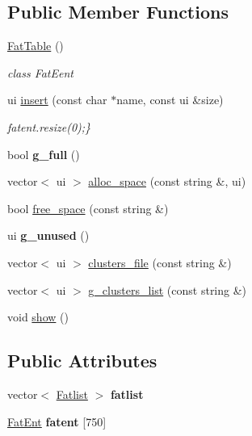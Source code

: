 \subsection*{Public Member Functions}
\begin{DoxyCompactItemize}
\item 
\hyperlink{classFatTable_a848a7e9e14bd9d24fcfb48449fdfae77}{Fat\+Table} ()
\begin{DoxyCompactList}\small\item\em class Fat\+Eent \end{DoxyCompactList}\item 
ui \hyperlink{classFatTable_ae5bcce7262ced6cab5a164c40307c350}{insert} (const char $\ast$name, const ui \&size)\hypertarget{classFatTable_ae5bcce7262ced6cab5a164c40307c350}{}\label{classFatTable_ae5bcce7262ced6cab5a164c40307c350}

\begin{DoxyCompactList}\small\item\em fatent.\+resize(0);\} \end{DoxyCompactList}\item 
bool {\bfseries g\+\_\+full} ()\hypertarget{classFatTable_a0cbc50b29715a3b78322072dc5e18138}{}\label{classFatTable_a0cbc50b29715a3b78322072dc5e18138}

\item 
vector$<$ ui $>$ \hyperlink{classFatTable_a566150049a050b7add0046800995bf06}{alloc\+\_\+space} (const string \&, ui)
\item 
bool \hyperlink{classFatTable_a1e1637f54b2cc7a6c436a3c8dd86f990}{free\+\_\+space} (const string \&)
\item 
ui {\bfseries g\+\_\+unused} ()\hypertarget{classFatTable_a7b290d7cbffd8ee2fb1deb5c84188c0e}{}\label{classFatTable_a7b290d7cbffd8ee2fb1deb5c84188c0e}

\item 
vector$<$ ui $>$ \hyperlink{classFatTable_a81b335ad0538ee26afd7db168516ab08}{clusters\+\_\+file} (const string \&)
\item 
vector$<$ ui $>$ \hyperlink{classFatTable_a30f820bb48f85776482ac5248735fdd2}{g\+\_\+clusters\+\_\+list} (const string \&)
\item 
void \hyperlink{classFatTable_a45b8a123cf7f9124a950aa27d9aa9e28}{show} ()
\end{DoxyCompactItemize}
\subsection*{Public Attributes}
\begin{DoxyCompactItemize}
\item 
vector$<$ \hyperlink{classFatlist}{Fatlist} $>$ {\bfseries fatlist}\hypertarget{classFatTable_aa6ba21e5bfde8f742c4fe3f181a44aa2}{}\label{classFatTable_aa6ba21e5bfde8f742c4fe3f181a44aa2}

\item 
\hyperlink{classFatEnt}{Fat\+Ent} {\bfseries fatent} \mbox{[}750\mbox{]}\hypertarget{classFatTable_a23728b70a23aa0f3311837e04159220e}{}\label{classFatTable_a23728b70a23aa0f3311837e04159220e}

\end{DoxyCompactItemize}


